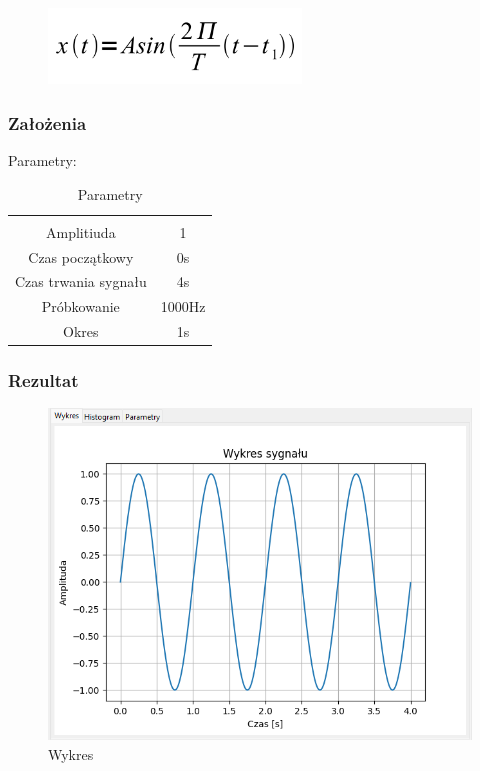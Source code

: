\documentclass{article}
\begin{document}
\begin{figure}[!htbp]
    \centering
    \includegraphics[width=0.6\textwidth]{img/sinus.png}
\end{figure}
\subsubsection{Założenia}
\noindent
Parametry:
\begin{table}[h!]
    \centering
    \vspace{0.2cm}
    \begin{tabular}{|c|c|}
        \hline\hline\\[-0.4cm]
        Amplitiuda & 1  \\
        \hline
        Czas początkowy & 0s  \\
        \hline
        Czas trwania sygnału & 4s  \\
        \hline
        Próbkowanie & 1000Hz \\
        \hline
        Okres & 1s\\
        \hline
    \end{tabular}
    \caption{Parametry}
    \label{sinus}
\end{table}
\subsubsection{Rezultat}
\begin{figure}[h!]
    \centering
    \includegraphics[width=\textwidth]{img/sinus/wykres.png}
    \caption{Wykres}
\end{figure}
\end{document}
